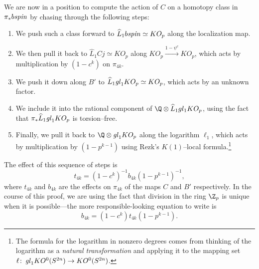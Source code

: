 We are now in a position to compute the action of $C$ on a homotopy class in $\pi_* b\mathit{spin}$ by chasing through the following steps:
\begin{enumerate}
    \item We push such a class forward to $\widehat L_1 b\mathit{spin} \simeq KO_p$ along the localization map.
    \item We then pull it back to $\widehat L_1 Cj \simeq KO_p$ along $KO_p \xrightarrow{1 - \psi^c} KO_p$, which acts by multiplication by $(1 - c^k)$ on $\pi_{4k}$.
    \item We push it down along $B'$ to $\widehat L_1 \mathit{gl}_1 KO_p \simeq KO_p$, which acts by an unknown factor.
    \item We include it into the rational component of $\Q \otimes \widehat L_1 gl_1 KO_p$, using the fact that $\pi_* \widehat L_1 \mathit{gl}_1 KO_p$ is torsion--free.
    \item Finally, we pull it back to $\Q \otimes \gl_1 KO_p$ along the logarithm $\ell_1$, which acts by multiplication by $(1 - p^{k-1})$ using Rezk's $K(1)$--local formula.\footnote{The formula for the logarithm in nonzero degrees comes from thinking of the logarithm as a \emph{natural transformation} and applying it to the mapping set $\ell\colon\thinspace \mathit{gl}_1 KO^0(S^{2n}) \to KO^0(S^{2n})$.}
\end{enumerate}
The effect of this sequence of steps is \[t_{4k} = (1 - c^k)^{-1} b_{4k} (1 - p^{k-1})^{-1},\] where $t_{4k}$ and $b_{4k}$ are the effects on $\pi_{4k}$ of the maps $C$ and $B'$ respectively.  In the course of this proof, we are using the fact that division in the ring $\Z_p$ is unique when it is possible---the more responsible-looking equation to write is \[b_{4k} = (1 - c^k) t_{4k} (1 - p^{k-1}).\]

